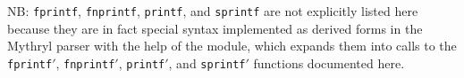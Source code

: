 
{\sc NB:} {\tt fprintf}, {\tt fnprintf}, {\tt printf}, and {\tt sprintf} are not explicitly listed here because they 
are in fact special syntax implemented as derived forms in the Mythryl parser with the help 
of the  module, 
which expands them into calls to the 
{\tt fprintf$'$}, 
{\tt fnprintf$'$}, 
{\tt printf$'$}, and 
{\tt sprintf$'$} 
functions documented here.

